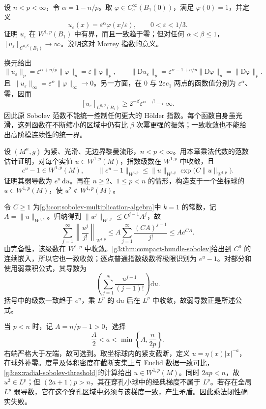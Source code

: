 \begin{exercise}\label{g3:ex:morrey-sharp-exponent}
	设 \(n<p<\infty\)，令 \(\alpha=1-n/p\)。取 \(\varphi\in C_c^\infty(B_1(0))\)，满足 \(\varphi(0)=1\)，并定义
	\[
		u_\varepsilon(x)=\varepsilon^\alpha\varphi(x/\varepsilon),
		\qquad 0<\varepsilon<1/3.
	\]
	证明 \(u_\varepsilon\) 在 \(W^{1,p}(B_1)\) 中有界，而且一致趋于零；但对任何 \(\alpha<\beta\le1\)，\([u_\varepsilon]_{C^{0,\beta}(B_1)}\to\infty\)。说明这对 Morrey 指数的意义。
\end{exercise}
\begin{solution}
	换元给出
	\[
		\|u_\varepsilon\|_p=\varepsilon^{\alpha+n/p}\|\varphi\|_p
		=\varepsilon\|\varphi\|_p,\qquad
		\|\mathrm Du_\varepsilon\|_p=\varepsilon^{\alpha-1+n/p}\|\mathrm D\varphi\|_p
		=\|\mathrm D\varphi\|_p.
	\]
	且 \(\|u_\varepsilon\|_\infty=\varepsilon^\alpha\|\varphi\|_\infty\to0\)。另一方面，在 \(0\) 与 \(2\varepsilon e_1\) 两点的函数值分别为 \(\varepsilon^\alpha\)、零，因而
	\[
		[u_\varepsilon]_{C^{0,\beta}(B_1)}\ge2^{-\beta}\varepsilon^{\alpha-\beta}\longrightarrow\infty.
	\]
	因此原 Sobolev 范数不能统一控制任何更大的 Hölder 指数。每个函数自身虽光滑，这列函数在不断缩小的区域中仍有比 \(\beta\) 次幂更强的振荡；一致收敛也不能给出高阶模连续性的统一界。
\end{solution}

\begin{exercise}\label{g3:ex:sobolev-multiplication-threshold}
	设 \((M^n,g)\) 为紧、光滑、无边界黎曼流形，\(n<p<\infty\)。用本章乘法代数的范数估计证明，对每个实值 \(u\in W^{1,p}(M)\)，指数级数在 \(W^{1,p}\) 中收敛，且
	\[
		e^u-1\in W^{1,p}(M),\qquad
		\|e^u-1\|_{W^{1,p}}\le\|u\|_{W^{1,p}}\exp\bigl(C\|u\|_{W^{1,p}}\bigr).
	\]
	证明其弱导数为 \(e^u\,\mathrm du\)。再在 \(n\ge2\)、\(1\le p<n\) 的情形，构造支于一个坐标球的 \(u\in W^{1,p}(M)\)，使 \(u^2\notin W^{1,p}(M)\)。
\end{exercise}
\begin{solution}
	令 \(C\ge1\) 为\cref{g3:cor:sobolev-multiplication-algebra}中 \(k=1\) 的常数，记 \(A=\|u\|_{W^{1,p}}\)。归纳得到 \(\|u^j\|_{W^{1,p}}\le C^{j-1}A^j\)，故
	\[
		\sum_{j=1}^\infty\left\|\frac{u^j}{j!}\right\|_{W^{1,p}}
		\le A\sum_{j=1}^\infty\frac{(CA)^{j-1}}{j!}\le A e^{CA}.
	\]
	由完备性，该级数在 \(W^{1,p}\) 中收敛。\cref{g3:thm:compact-bundle-sobolev}给出到 \(C^0\) 的连续嵌入，所以它也一致收敛；逐点普通指数级数将极限识别为 \(e^u-1\)。对部分和使用弱乘积公式，其导数为
	\[
		\left(\sum_{j=1}^N\frac{u^{j-1}}{(j-1)!}\right)\mathrm du.
	\]
	括号中的级数一致趋于 \(e^u\)，乘 \(L^p\) 的 \(\mathrm du\) 后在 \(L^p\) 中收敛，故弱导数正是所述公式。

	当 \(p<n\) 时，记 \(A=n/p-1>0\)，选择
	\[
		\frac A2<a<\min\left\{A,\frac n{2p}\right\}.
	\]
	右端严格大于左端，故可选到。取坐标球内的紧支截断，定义 \(u=\eta(x)|x|^{-a}\)，在球外补零。度量及体积密度在截断支集上与 Euclid 数据一致可比，\cref{g3:ex:radial-sobolev-threshold}的计算给出 \(u\in W^{1,p}(M)\)。同时 \(2ap<n\)，故 \(u^2\in L^p\)；但 \((2a+1)p>n\)，其在穿孔小球中的经典梯度不属于 \(L^p\)。若存在全局 \(L^p\) 弱导数，它在这个穿孔区域中必须与该梯度一致，产生矛盾。因此乘法闭性确实失败。
\end{solution}

